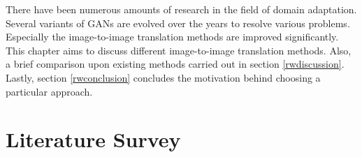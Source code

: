 
\justifying
\setlength{\parskip}{1em}


There have been numerous amounts of research in the field of domain adaptation. Several variants of \acp{GAN} are evolved over the years to resolve various problems. Especially the image-to-image translation methods are improved significantly. This chapter aims to discuss different image-to-image translation methods. Also, a brief comparison upon existing methods carried out in section \ref{rwdiscussion}. Lastly, section \ref{rwconclusion} concludes the motivation behind choosing a particular approach.



\section{Literature Survey}\label{LiteratureSurvey}




